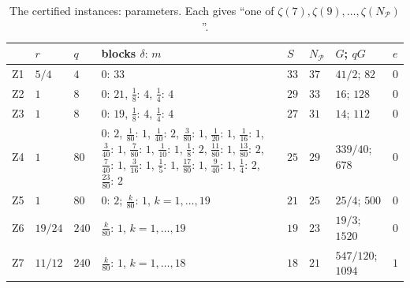 \documentclass[11pt]{amsart}
\theoremstyle{definition}
\theoremstyle{remark}
\numberwithin{equation}{section}
\newcommand{\cP}{\mathcal{P}}
\begin{document}
\begin{table}[ht]
\centering\footnotesize
\begin{tabular}{@{}l>{\raggedright\arraybackslash}p{}l>{\raggedright\arraybackslash}p{}llll@{}}
\toprule
 & $r$ & $q$ & blocks $\delta{:}\,m$ & $S$ & $N_\cP$ & $G$; $qG$ & $e$\\
\midrule
Z1 & $5/4$ & $4$ & $0{:}\,33$ & $33$ & $37$ & $41/2$; $82$ & $0$\\
Z2 & $1$ & $8$ & $0{:}\,21$, $\frac18{:}\,4$, $\frac14{:}\,4$ & $29$ & $33$ & $16$; $128$ & $0$\\
Z3 & $1$ & $8$ & $0{:}\,19$, $\frac18{:}\,4$, $\frac14{:}\,4$ & $27$ & $31$ & $14$; $112$ & $0$\\
Z4 & $1$ & $80$ & $0{:}\,2$, $\frac1{80}{:}\,1$, $\frac1{40}{:}\,2$, $\frac3{80}{:}\,1$, $\frac1{20}{:}\,1$,
  $\frac1{16}{:}\,1$, $\frac3{40}{:}\,1$, $\frac7{80}{:}\,1$, $\frac1{10}{:}\,1$, $\frac18{:}\,2$, $\frac{11}{80}{:}\,1$,
  $\frac{13}{80}{:}\,2$, $\frac7{40}{:}\,1$, $\frac3{16}{:}\,1$, $\frac15{:}\,1$, $\frac{17}{80}{:}\,1$,
  $\frac9{40}{:}\,1$, $\frac14{:}\,2$, $\frac{23}{80}{:}\,2$ & $25$ & $29$ & $339/40$; $678$ & $0$\\
Z5 & $1$ & $80$ & $0{:}\,2$; $\frac k{80}{:}\,1$, $k=1,\dots,19$ & $21$ & $25$ & $25/4$; $500$ & $0$\\
Z6 & $19/24$ & $240$ & $\frac k{80}{:}\,1$, $k=1,\dots,19$ & $19$ & $23$ & $19/3$; $1520$ & $0$\\
Z7 & $11/12$ & $240$ & $\frac k{80}{:}\,1$, $k=1,\dots,18$ & $18$ & $21$ & $547/120$; $1094$ & $1$\\
\bottomrule
\end{tabular}
\caption{The certified instances: parameters. Each gives ``one of $\zeta(7),\zeta(9),\dots,\zeta(N_\cP)$''.}\label{tab:instances}
\end{table}
\end{document}
